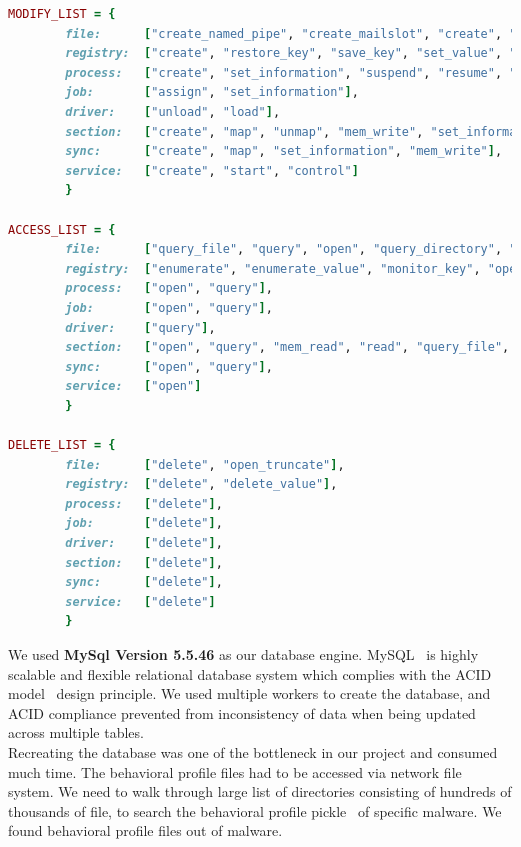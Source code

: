 \begin{lstlisting}[float,floatplacement=ht,numbers=none,language=ruby,caption={Mapping of generalized OS Operation from behavioral profile},label={lbl:ntapi}]
MODIFY_LIST = {
        file:      ["create_named_pipe", "create_mailslot", "create", "rename", "set_information", "write", "flush_buffer", "map"],
        registry:  ["create", "restore_key", "save_key", "set_value", "set_information", "mem_write"],
        process:   ["create", "set_information", "suspend", "resume", "unmap", "map"],
        job:       ["assign", "set_information"],
        driver:    ["unload", "load"],
        section:   ["create", "map", "unmap", "mem_write", "set_information"],
        sync:      ["create", "map", "set_information", "mem_write"],
        service:   ["create", "start", "control"]
        }

ACCESS_LIST = {
        file:      ["query_file", "query", "open", "query_directory", "query_information", "read", "monitor_dir", "query_value"],
        registry:  ["enumerate", "enumerate_value", "monitor_key", "open", "query", "query_value", "mem_read"],
        process:   ["open", "query"],
        job:       ["open", "query"],
        driver:    ["query"],
        section:   ["open", "query", "mem_read", "read", "query_file", "query_system"],
        sync:      ["open", "query"],
        service:   ["open"]
        }

DELETE_LIST = {
        file:      ["delete", "open_truncate"],
        registry:  ["delete", "delete_value"],
        process:   ["delete"],
        job:       ["delete"],
        driver:    ["delete"],
        section:   ["delete"],
        sync:      ["delete"],
        service:   ["delete"]
        }

\end{lstlisting}


We used \textbf{MySql Version 5.5.46} as our database engine. MySQL~\cite[]{mysql} is highly scalable and flexible relational database system which complies with the ACID model~\cite[]{acid} design principle.
We used multiple workers to create the database, and ACID compliance prevented from inconsistency of data when being updated across multiple tables.\\

Recreating the database was one of the bottleneck in our project and consumed much time.
The behavioral profile files had to be accessed via network file system.
We need to walk through large list of directories consisting of hundreds of thousands of file, to search the behavioral profile pickle~\cite[]{pythonpickle} of specific malware.
We found \emph{\gettotalmalwareii{}} behavioral profile files out of \emph{\gettotalmalwarei{}} malware.\\

